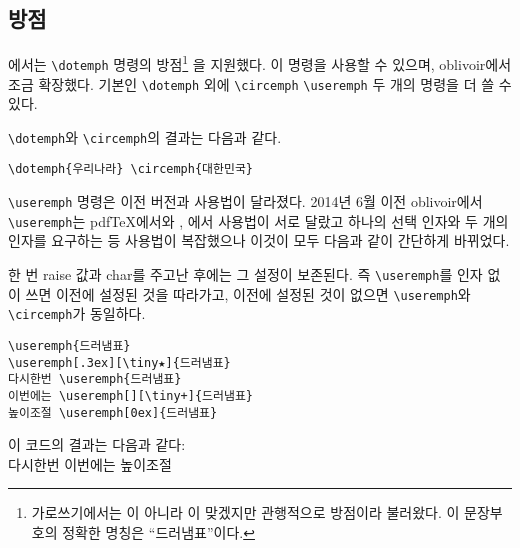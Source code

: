 \documentclass[
	12pt,
	a4paper,
	kosection,
	footnote,
	nobookmarks,
	microtype,
]{oblivoir}
\def\cs#1{\texttt{\textbackslash #1}}
\def\xetexko{\XeTeX-\ko}
\def\luatexko{\LuaTeX-\ko}
\begin{document}
\subsection{방점}

\koTeX 에서는 \texttt{\textbackslash dotemph} 명령의 방점\footnote{%
	가로쓰기에서는  이 아니라
	이 맞겠지만 관행적으로 방점이라 불러왔다.
	이 문장부호의 정확한 명칭은 “드러냄표”이다.}%
을 지원했다.   이 명령을 사용할 수 있으며,
oblivoir에서 조금 확장했다. 기본인
\texttt{\textbackslash dotemph}
외에
\texttt{\textbackslash circemph}
\texttt{\textbackslash useremph}
두 개의 명령을 더 쓸 수 있다.

\cs{dotemph}와 \cs{circemph}의 결과는 다음과 같다.

\medskip

\noindent\begin{minipage}{.45\textwidth}
\begin{verbatim}
\dotemph{우리나라} \circemph{대한민국}
\end{verbatim}
\end{minipage}\hfill
\begin{minipage}{.45\textwidth}
 
\end{minipage}

\medskip

\cs{useremph} 명령은 이전 버전과 사용법이 달라졌다. 2014년 6월 이전 oblivoir에서
\cs{useremph}는 pdf\TeX 에서와 \XeTeX, \LuaTeX 에서 사용법이 서로 달랐고 
하나의 선택 인자와 두 개의 인자를 요구하는 등 사용법이 복잡했으나 이것이 모두 다음과 같이
간단하게 바뀌었다.
\begin{boxedverbatim}
\end{boxedverbatim}
한 번 raise 값과 char를 주고난 후에는 그 설정이 보존된다. 즉 \cs{useremph}를
인자 없이 쓰면 이전에 설정된 것을 따라가고, 이전에 설정된 것이 없으면 \cs{useremph}와
\cs{circemph}가 동일하다.

\begin{verbatim}
\useremph{드러냄표}
\useremph[.3ex][\tiny★]{드러냄표}
다시한번 \useremph{드러냄표}
이번에는 \useremph[][\tiny+]{드러냄표}
높이조절 \useremph[0ex]{드러냄표}
\end{verbatim}

이 코드의 결과는 다음과 같다:\\
 다시한번 
이번에는 
높이조절 
\end{document}
